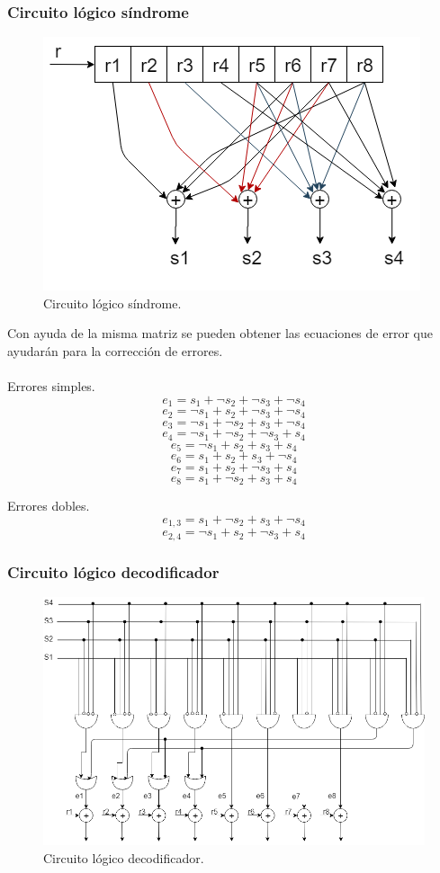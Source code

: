 \documentclass[12pt,letterpaper]{article}
\begin{document}
\subsubsection{Circuito lógico síndrome}
\begin{figure}[ht]
    \centering
    \includegraphics[width=.6\textwidth]{sind.png}
    \caption{Circuito lógico síndrome.}
\end{figure}

\newpage
Con ayuda de la misma matriz se pueden obtener las ecuaciones de error que ayudarán para 
la corrección de errores.
\\ \\
Errores simples.
$$e_1=s_1+\neg s_2+\neg s_3+\neg s_4$$
$$e_2=\neg s_1+s_2+\neg s_3+\neg s_4$$
$$e_3=\neg s_1+\neg s_2+s_3+\neg s_4$$
$$e_4=\neg s_1+\neg s_2+\neg s_3+s_4$$
$$e_5=\neg s_1+s_2+s_3+s_4$$
$$e_6=s_1+s_2+s_3+\neg s_4$$
$$e_7=s_1+s_2+\neg s_3+s_4$$
$$e_8=s_1+\neg s_2+s_3+s_4$$

Errores dobles.
$$e_{1,3}=s_1+\neg s_2+s_3+\neg s_4$$
$$e_{2,4}=\neg s_1+s_2+\neg s_3+s_4$$

\newpage
\subsubsection{Circuito lógico decodificador}
\begin{figure}[ht]
    \centering
    \includegraphics[angle=90,width=.58\textwidth]{decod.png}
    \caption{Circuito lógico decodificador.}
\end{figure}
\end{document}
